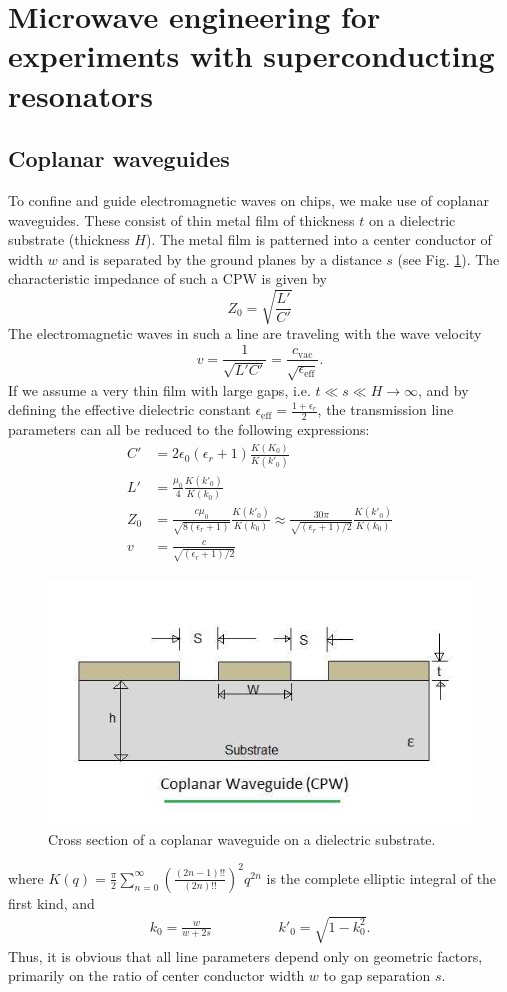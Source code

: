 \section{Microwave engineering for experiments with superconducting resonators}


\subsection{Coplanar waveguides}
To confine and guide electromagnetic waves on chips, we make use of coplanar waveguides.
These consist of thin metal film of thickness $t$ on a dielectric substrate (thickness $H$).
The metal film is patterned into a center conductor of width $w$ and is separated by the ground planes by a distance $s$ (see Fig. \ref{fig:cpw-coplanar-waveguide}).
The characteristic impedance of such a CPW is given by
\begin{equation}
Z_0 = \sqrt{\frac{L'}{C'}}
\end{equation}
The electromagnetic waves in such a line are traveling with the wave velocity \begin{equation}
v=\frac{1}{\sqrt{L'C'}}=\frac{c_\mathrm{vac}}{\sqrt{\epsilon_\mathrm{eff}}}.
\end{equation}
If we assume a very thin film with large gaps, i.e. $t \ll s \ll H \rightarrow \infty$, and by defining the effective dielectric constant $\epsilon_\mathrm{eff} = \frac{1+\epsilon_r}{2}$, the transmission line parameters can all be reduced to the following expressions:
\begin{align}
C' &= 2\epsilon_0(\epsilon_r+1)\frac{K(K_0)}{K(k'_0)} \\%
L' &= \frac{\mu_0}{4}\frac{K(k'_0)}{K(k_0)} \\%
Z_0 &= \frac{c\mu_0}{\sqrt{8(\epsilon_r+1)}}\frac{K(k'_0)}{K(k_0)}\approx \frac{30\pi}{\sqrt{(\epsilon_r+1)/2}}\frac{K(k'_0)}{K(k_0)} \\%
v &= \frac{c}{\sqrt{(\epsilon_r+1)/2}}
\end{align}
\begin{figure}
	\centering
	\includegraphics[width=0.3\linewidth]{chapter-theory/figs-RF/CPW-Coplanar-Waveguide.jpg}
	\caption{Cross section of a coplanar waveguide on a dielectric substrate.}
	\label{fig:cpw-coplanar-waveguide}
\end{figure}
where $K(q) = \frac{\pi}{2}\sum_{n=0}^{\infty}\left(\frac{(2n-1)!!}{(2n)!!}\right)^2 q^{2n}$ is the complete elliptic integral of the first kind, and
\begin{align}
k_0 = \frac{w}{w+2s} \hspace{2cm} k'_0 = \sqrt{1-k_0^2}.
\end{align}
Thus, it is obvious that all line parameters depend only on geometric factors, primarily on the ratio of center conductor width $w$ to gap separation $s$.


